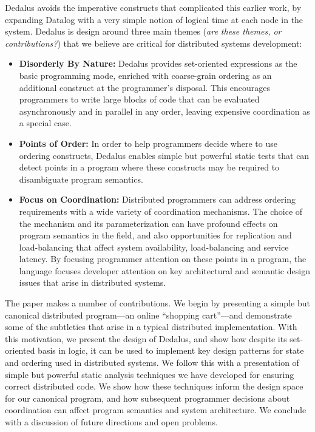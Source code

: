 Dedalus avoids the imperative constructs that complicated this earlier work, by expanding Datalog with a very simple notion of logical time at each node in the system.  Dedalus is design around three main themes ({\em are these themes, or contributions?}) that we believe are critical for distributed systems development:
\begin{itemize}
    \item {\bf Disorderly By Nature:} Dedalus provides set-oriented expressions as the basic programming mode, enriched with coarse-grain ordering as an additional construct at the programmer's disposal.  This encourages programmers to write large blocks of code that can be evaluated asynchronously and in parallel in any order, leaving expensive coordination as a special case.
    \item {\bf Points of Order:} In order to help programmers decide where to use ordering constructs, Dedalus enables simple but powerful static tests that can detect points in a program where these constructs may be required to disambiguate program semantics.
    \item {\bf Focus on Coordination:} Distributed programmers can address ordering requirements with a wide variety of coordination mechanisms. The choice of the mechanism and its parameterization can have profound effects on program semantics in the field, and also opportunities for replication and load-balancing that affect system availability, load-balancing and service latency.  By focusing programmer attention on these points in a program, the language focuses developer attention on key architectural and semantic design issues that arise in distributed systems. 
\end{itemize}

The paper makes a number of contributions.  We begin by presenting a simple but canonical distributed program---an online ``shopping cart''---and demonstrate some of the subtleties that arise in a typical distributed implementation.  With this motivation, we present the design of Dedalus, and show how despite its set-oriented basis in logic, it can be used to implement key design patterns for state and ordering used in distributed systems.  We follow this with a presentation of simple but powerful static analysis techniques we have developed for ensuring correct distributed code.  We show how these techniques inform the design space for our canonical program, and how subsequent programmer decisions about coordination can affect program semantics and system architecture.  We conclude with a discussion of future directions and open problems.